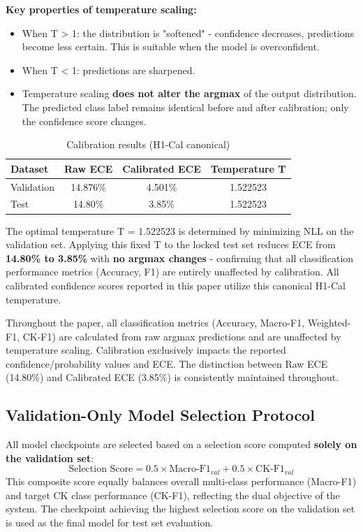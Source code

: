 \textbf{Key properties of temperature scaling:}
\begin{itemize}
    \item When T > 1: the distribution is "softened" - confidence decreases, predictions become less certain. This is suitable when the model is overconfident.
    \item When T < 1: predictions are sharpened.
    \item Temperature scaling \textbf{does not alter the argmax} of the output distribution. The predicted class label remains identical before and after calibration; only the confidence score changes.
\end{itemize}

\begin{table}[!htbp]
\centering
\caption{Calibration results (H1-Cal canonical)}
\begin{tabularx}{\linewidth}{|X|c|c|c|}
\hline
\textbf{Dataset} & \textbf{Raw ECE} & \textbf{Calibrated ECE} & \textbf{Temperature T} \\
\hline
Validation & 14.876\% & 4.501\% & 1.522523 \\
\hline
Test & 14.80\% & 3.85\% & 1.522523 \\
\hline
\end{tabularx}
\end{table}

The optimal temperature T = 1.522523 is determined by minimizing NLL on the validation set. Applying this fixed T to the locked test set reduces ECE from \textbf{14.80\% to 3.85\%} with \textbf{no argmax changes} - confirming that all classification performance metrics (Accuracy, F1) are entirely unaffected by calibration. All calibrated confidence scores reported in this paper utilize this canonical H1-Cal temperature.

Throughout the paper, all classification metrics (Accuracy, Macro-F1, Weighted-F1, CK-F1) are calculated from raw argmax predictions and are unaffected by temperature scaling. Calibration exclusively impacts the reported confidence/probability values and ECE. The distinction between Raw ECE (14.80\%) and Calibrated ECE (3.85\%) is consistently maintained throughout.

\subsection{Validation-Only Model Selection Protocol}
All model checkpoints are selected based on a selection score computed \textbf{solely on the validation set}:
\begin{equation}
\text{Selection Score} = 0.5 \times \text{Macro-F1}_{val} + 0.5 \times \text{CK-F1}_{val}
\end{equation}
This composite score equally balances overall multi-class performance (Macro-F1) and target CK class performance (CK-F1), reflecting the dual objective of the system. The checkpoint achieving the highest selection score on the validation set is used as the final model for test set evaluation.

